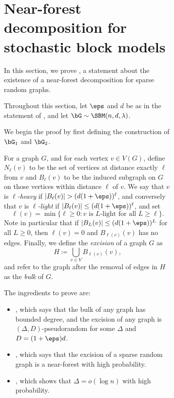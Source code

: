 \documentclass[11pt,letterpaper]{article}
\begin{document}
\begin{figure}
\begin{figure}


\section{Near-forest decomposition for stochastic block models}
\label{sec:extinction}
In this section, we prove , a statement about the existence of a near-forest decomposition for sparse random graphs.
\randomgraphdecomp*
\begin{notation*}[$\eps,\, d,\, \bG$]
Throughout this section, let $\eps$ and $d$ be as in the statement of , and let $\bG\sim\SBM(n, d, \lambda)$.
\end{notation*}

We begin the proof by first defining the construction of $\bG_1$ and $\bG_2$.

\begin{definition}
    For a graph $G$, and for each vertex $v\in V(G)$, define $N_\ell(v)$ to be the set of vertices at distance exactly $\ell$ from $v$ and $B_\ell(v)$ to be the induced subgraph on $G$ on those vertices within distance $\ell$ of $v$. 
    We say that $v$ is \emph{$\ell$-heavy} if $|B_\ell(v)| > (d(1+\eps))^\ell$, and conversely that $v$ is \emph{$\ell$-light} if $|B_{\ell}(v)| \le (d(1+\eps))^{\ell}$, and set
    \[
        \ell(v) = \min\{ \ell \ge 0 : v \text{ is $L$-light for all $L \ge \ell$} \}.
    \]
    Note in particular that if $|B_L(v)| \le (d(1+\eps))^L$ for all $L \ge 0$, then $\ell(v) = 0$ and $B_{\ell(v)}(v)$ has no edges.
    Finally, we define the \emph{excision} of a graph $G$ as
    \[
        H \coloneqq \bigcup_{v \in V} B_{\ell(v)}(v),
    \]
    and refer to the graph after the removal of edges in $H$ as the \emph{bulk} of $G$.
\end{definition}

The ingredients to prove  are:
\begin{itemize}
    \item {}, which says that the bulk of any graph has bounded degree, and the excision of any graph is $(\Delta, D)$-pseudorandom for some $\Delta$ and $D = (1+\eps)d$.
    \item {}, which says that the excision of a sparse random graph is a near-forest with high probability.
    \item {}, which shows that $\Delta = o(\log n)$ with high probability.
\end{itemize}


\end{figure}
\end{figure}
\end{document}
